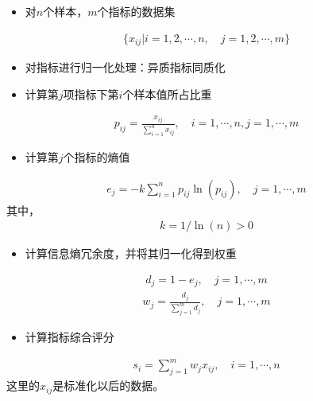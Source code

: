 \documentclass[letterpaper,10pt,english]{sphinxmanual}
\begin{document}
\begin{itemize}
\item {} 
对\(n\)个样本，\(m\)个指标的数据集

\end{itemize}
\begin{equation*}
\begin{split}
\{x_{ij}|i = 1,2,\cdots,n, \quad j = 1,2,\cdots,m\}
\end{split}
\end{equation*}\begin{itemize}
\item {} 
对指标进行归一化处理：异质指标同质化

\item {} 
计算第\(j\)项指标下第\(i\)个样本值所占比重

\end{itemize}
\begin{equation*}
\begin{split}
p_{i j}=\frac{x_{i j}}{\displaystyle\sum_{i=1}^{n} x_{i j}}, \quad i=1, \cdots, n, j=1, \cdots, m
\end{split}
\end{equation*}\begin{itemize}
\item {} 
计算第\(j\)个指标的熵值

\end{itemize}
\begin{equation*}
\begin{split}
e_{j}=-k \sum_{i=1}^{n} p_{i j} \ln \left(p_{i j}\right), \quad j=1, \cdots, m
\end{split}
\end{equation*}
其中，
\begin{equation*}
\begin{split}
k=1 / \ln (n)>0
\end{split}
\end{equation*}\begin{itemize}
\item {} 
计算信息熵冗余度，并将其归一化得到权重

\end{itemize}
\begin{equation*}
\begin{split}
d_{j}=1-e_{j}, \quad j=1, \cdots, m
\end{split}
\end{equation*}\begin{equation*}
\begin{split}
w_{j}=\frac{d_{j}}{\displaystyle\sum_{j=1}^{m} d_{j}}, \quad j=1, \cdots, m
\end{split}
\end{equation*}\begin{itemize}
\item {} 
计算指标综合评分

\end{itemize}
\begin{equation*}
\begin{split}
s_{i}=\sum_{j=1}^{m} w_{j} x_{i j}, \quad i=1, \cdots, n
\end{split}
\end{equation*}
这里的\(x_{ij}\)是标准化以后的数据。
\end{document}
